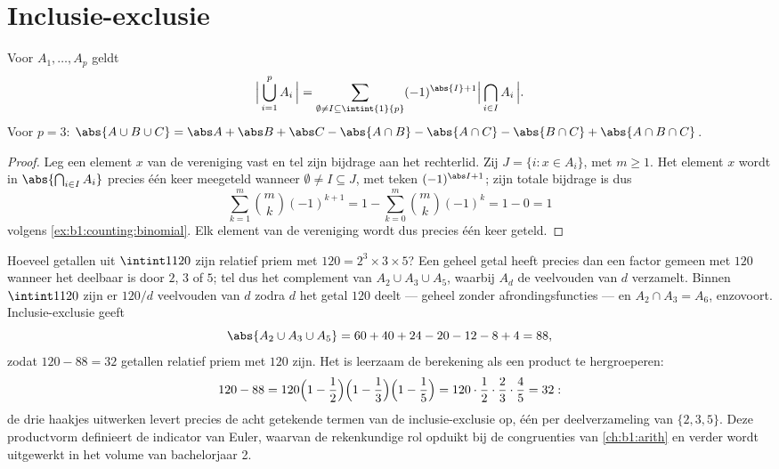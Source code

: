 \section{Inclusie-exclusie}

\begin{theorem}\label{thm:b1:counting:inclexcl}
Voor  $A_1, \dots, A_p$ geldt
\[
\Bigl|\, \bigcup_{i=1}^{p} A_i \,\Bigr|
= \sum_{\emptyset \neq I \subseteq \intint{1}{p}}
(-1)^{\abs{I}+1} \Bigl|\, \bigcap_{i \in I} A_i \,\Bigr| .
\]
Voor $p = 3$:
$\abs{A \cup B \cup C} = \abs A + \abs B + \abs C - \abs{A \cap B} -
\abs{A \cap C} - \abs{B \cap C} + \abs{A \cap B \cap C}$.
\end{theorem}

\begin{proof}
Leg een element $x$ van de vereniging vast en tel zijn bijdrage aan het
rechterlid. Zij $J = \{i : x \in A_i\}$, met  $m \geq 1$.
Het element $x$ wordt in $\abs{\bigcap_{i \in I} A_i}$ precies één keer
meegeteld wanneer $\emptyset \neq I \subseteq J$, met teken $(-1)^{\abs I
+ 1}$; zijn totale bijdrage is dus
\[
\sum_{k=1}^{m} \binom{m}{k} (-1)^{k+1}
= 1 - \sum_{k=0}^{m} \binom mk (-1)^k = 1 - 0 = 1
\]
volgens \cref{ex:b1:counting:binomial}. Elk element van de vereniging
wordt dus precies één keer geteld.
\end{proof}

\begin{example}\label{ex:b1:counting:coprime}
Hoeveel getallen uit $\intint1{120}$ zijn relatief priem met $120 =
2^3 \times 3 \times 5$? Een geheel getal heeft precies dan een factor
gemeen met $120$ wanneer het deelbaar is door $2$, $3$ of $5$; tel
dus het complement van $A_2 \cup A_3 \cup A_5$, waarbij $A_d$ de
veelvouden van $d$ verzamelt. Binnen $\intint1{120}$ zijn er $120/d$
veelvouden van $d$ zodra $d$ het getal $120$ deelt --- geheel zonder
afrondingsfuncties --- en $A_2 \cap A_3 = A_6$, enzovoort.
Inclusie-exclusie geeft
\[
\abs{A_2 \cup A_3 \cup A_5}
= 60 + 40 + 24 - 20 - 12 - 8 + 4 = 88 ,
\]
zodat $120 - 88 = 32$ getallen relatief priem met $120$ zijn. Het is
leerzaam de berekening als een product te hergroeperen:
\[
120 - 88 = 120\Bigl(1 - \frac12\Bigr)\Bigl(1 -
\frac13\Bigr)\Bigl(1 - \frac15\Bigr) = 120 \cdot \frac12 \cdot
\frac23 \cdot \frac45 = 32 :
\]
de drie haakjes uitwerken levert precies de acht getekende termen van
de inclusie-exclusie op, één per deelverzameling van $\{2, 3, 5\}$.
Deze productvorm definieert de indicator van Euler, waarvan de
rekenkundige rol opduikt bij de congruenties van \cref{ch:b1:arith}
en verder wordt uitgewerkt in het volume van bachelorjaar 2.
\end{example}

